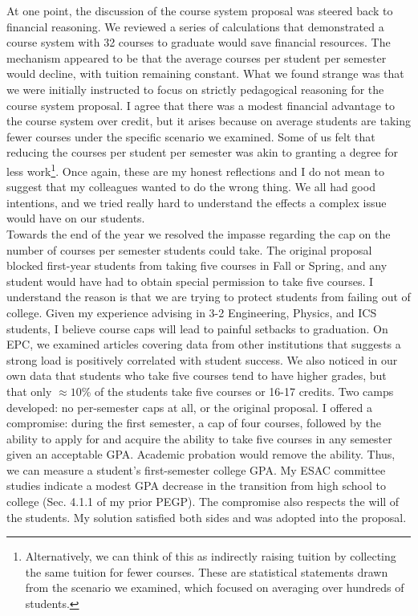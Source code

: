 \documentclass[../../../main.tex]{subfiles}
\begin{document}
At one point, the discussion of the course system proposal was steered back to financial reasoning.  We reviewed a series of calculations that demonstrated a course system with 32 courses to graduate would save financial resources.  The mechanism appeared to be that the average courses per student per semester would decline, with tuition remaining constant.  What we found strange was that we were initially instructed to focus on strictly pedagogical reasoning for the course system proposal.  I agree that there was a modest financial advantage to the course system over credit, but it arises because on average students are taking fewer courses under the specific scenario we examined.  Some of us felt that reducing the courses per student per semester was akin to granting a degree for less work\footnote{Alternatively, we can think of this as indirectly raising tuition by collecting the same tuition for fewer courses.  These are statistical statements drawn from the scenario we examined, which focused on averaging over hundreds of students.}.  Once again, these are my honest reflections and I do not mean to suggest that my colleagues wanted to do the wrong thing.  We all had good intentions, and we tried really hard to understand the effects a complex issue would have on our students.
\\
\vspace{0.25cm}
Towards the end of the year we resolved the impasse regarding the cap on the number of courses per semester students could take.  The original proposal blocked first-year students from taking five courses in Fall or Spring, and any student would have had to obtain special permission to take five courses.  I understand the reason is that we are trying to protect students from failing out of college.  Given my experience advising in 3-2 Engineering, Physics, and ICS students, I believe course caps will lead to painful setbacks to graduation.  On EPC, we examined articles covering data from other institutions that suggests a strong load is positively correlated with student success.  We also noticed in our own data that students who take five courses tend to have higher grades, but that only $\approx 10$\% of the students take five courses or 16-17 credits.  Two camps developed: no per-semester caps at all, or the original proposal.  I offered a compromise: during the first semester, a cap of four courses, followed by the ability to apply for and acquire the ability to take five courses in any semester given an acceptable GPA.  Academic probation would remove the ability.  Thus, we can measure a student's first-semester college GPA.  My ESAC committee studies indicate a modest GPA decrease in the transition from high school to college (Sec. 4.1.1 of my prior PEGP).  The compromise also respects the will of the students.  My solution satisfied both sides and was adopted into the proposal.
\end{document}
